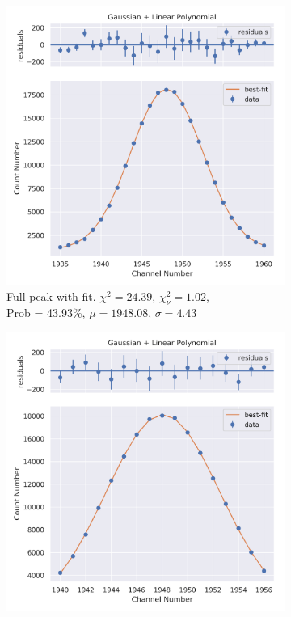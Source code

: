 \documentclass[11pt,a4paper]{article}
\begin{document}
\begin{figure}[H]
  \centering
  \begin{subfigure}{.5\linewidth}
    \centering
    \includegraphics[width=\linewidth]{./Images/Barium133/Linear/Linear_4_Full.png}
    \caption{Full peak with fit. $\chi^2 = 24.39$, $\chi^2_\nu = 1.02$, \\ Prob = 43.93\%, $\mu = 1948.08$, $\sigma = 4.43$}
  \end{subfigure}%
  \begin{subfigure}{.5\linewidth}
    \centering
    \includegraphics[width=\linewidth]{./Images/Barium133/Linear/Linear_4_Zoom.png}

\end{subfigure}
\end{figure}
\end{document}
